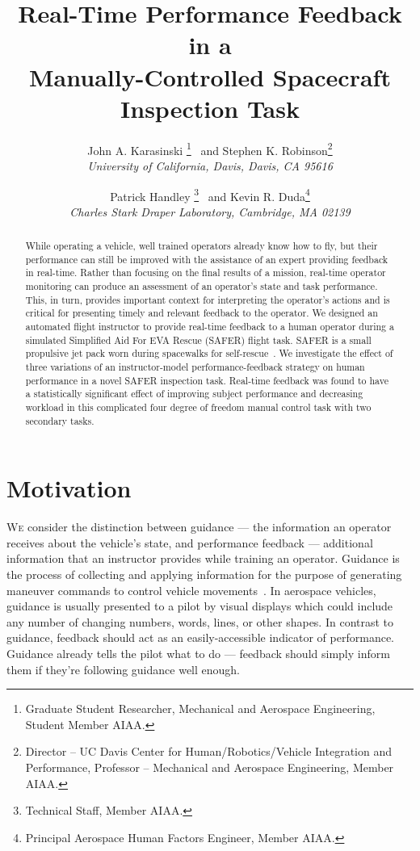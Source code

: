 \documentclass[]{aiaa-tc}%
\title{Real-Time Performance Feedback in a \\Manually-Controlled Spacecraft Inspection Task}
\author{
John A. Karasinski%
  \thanks{Graduate Student Researcher, Mechanical and Aerospace Engineering, Student Member AIAA.}
\ and Stephen K. Robinson\thanks{Director – UC Davis Center for Human/Robotics/Vehicle Integration and Performance, Professor – Mechanical and Aerospace Engineering, Member AIAA.}\\
{\normalsize\itshape
 University of California, Davis, Davis, CA 95616}\\
\and
Patrick Handley%
  \thanks{Technical Staff, Member AIAA.}
\ and Kevin R. Duda\thanks{Principal Aerospace Human Factors Engineer, Member AIAA.}\\
{\normalsize\itshape
 Charles Stark Draper Laboratory, Cambridge, MA 02139}\\
}
\begin{document}
\maketitle

\begin{abstract}
  While operating a vehicle, well trained operators already know how to fly, but their performance can still be improved with the assistance of an expert providing feedback in real-time. Rather than focusing on the final results of a mission, real-time operator monitoring can produce an assessment of an operator's state and task performance. This, in turn, provides important context for interpreting the operator's actions and is critical for presenting timely and relevant feedback to the operator. We designed an automated flight instructor to provide real-time feedback to a human operator during a simulated Simplified Aid For EVA Rescue (SAFER) flight task. SAFER is a small propulsive jet pack worn during spacewalks for self-rescue~\cite{safer}. We investigate the effect of three variations of an instructor-model performance-feedback strategy on human performance in a novel SAFER inspection task. Real-time feedback was found to have a statistically significant effect of improving subject performance and decreasing workload in this complicated four degree of freedom manual control task with two secondary tasks.
\end{abstract}

\section{Motivation}
\lettrine[nindent=0pt]{W}{e}
consider the distinction between guidance --- the information an operator receives about the vehicle's state, and performance feedback --- additional information that an instructor provides while training an operator. Guidance is the process of collecting and applying information for the purpose of generating maneuver commands to control vehicle movements~\cite{draper1965guidance}. In aerospace vehicles, guidance is usually presented to a pilot by visual displays which could include any number of changing numbers, words, lines, or other shapes. In contrast to guidance, feedback should act as an easily-accessible indicator of performance. Guidance already tells the pilot what to do --- feedback should simply inform them if they're following guidance well enough.
\end{document}
